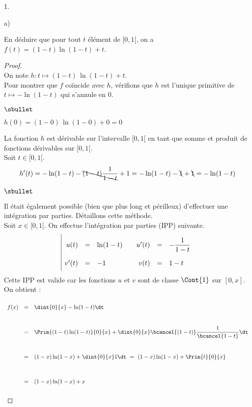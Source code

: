 \begin{noliste}{1.}
\begin{noliste}{a)}
  
  
  \newpage
  
  
  \item En déduire que pour tout $t$ élément de $[0,1[$, on a $f(t)= 
  (1-t)\ln(1-t)+t$. 
  
  \begin{proof}~\\
    On note $h:t\mapsto (1-t) \, \ln(1-t)+t$.\\
    Pour montrer que $f$ coïncide avec $h$, vérifions que $h$ est
    l'unique primitive de $t \mapsto -\ln(1-t)$ qui s'annule en $0$.
    \begin{noliste}{$\sbullet$}
      \item $h(0)=(1-0) \, \ln(1-0) +0=0$
      \item La fonction $h$ est dérivable sur l'intervalle $[0,1[$ en 
      tant que somme et produit de fonctions dérivables sur $[0,1[$.\\
      Soit $t\in [0,1[$.
      \[
        h'(t) = -\ln(1-t) -\bcancel{(1-t)} \dfrac{1}{\bcancel{1-t}}
        +1 = -\ln(1-t) -\bcancel{1} + \bcancel{1} = - \ln(1-t)
      \]
    \end{noliste}
    
    \begin{remark}
    \begin{noliste}{$\sbullet$}
      \item Il était également possible (bien que plus long et 
      périlleux) d'effectuer une intégration par parties. Détaillons 
      cette méthode.\\
      Soit $x\in [0,1[$. On effectue l'intégration par parties 
      (IPP) suivante.
      \[
	\renewcommand{\arraystretch}{2.2}
	\begin{array}{|rcl@{\qquad}rcl}
	  u(t) & = & \ln(1-t) & u'(t) & = & -\dfrac{1}{1-t} \\
	  v'(t) & = & -1 & v(t) & = & 1-t
	\end{array}
      \]
      Cette IPP est valide car les fonctions $u$ et $v$ sont de classe 
      $\Cont{1}$ sur $[0,x]$. On obtient :
      \[
        \begin{array}{rcl}
          f(x) &=& \dint{0}{x} - \ln(1-t) \dt 
          \\[.6cm]
          &=& \Prim{(1-t) \ln(1-t)}{0}{x}
          + \dint{0}{x} \bcancel{(1-t)}\dfrac{1}{\bcancel{1-t}} \dt
          \\[.6cm]
          &=& (1-x) \ln(1-x) + \dint{0}{x} 1 \dt
          \ = \ (1-x) \ln(1-x) + \Prim{t}{0}{x}
          \\[.6cm]
          &=& (1-x) \ln(1-x) + x
        \end{array}
      \]
      

\end{noliste}
\end{remark}
\end{proof}
\end{noliste}
\end{noliste}
